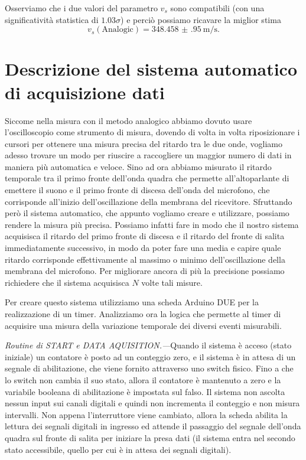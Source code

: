 \documentclass[
    prl,
    reprint, 
    superscriptaddress, 
    altaffilletter, 
    amsmath, 
    amssymb, 
    a4paper,
    varvw]{revtex4-2}
\begin{document}
Osserviamo che i due valori del parametro $v_s$ sono compatibili (con una significatività statistica di $1.03\sigma$) e perciò possiamo ricavare la miglior stima \[v_s(\text{Analogic})=\SI{348.458(950)}{\metre\per\second}.\]

\section{Descrizione del sistema automatico di acquisizione dati}
Siccome nella misura con il metodo analogico abbiamo dovuto usare l'oscilloscopio come strumento di misura, dovendo di volta in volta riposizionare i cursori per ottenere una misura precisa del ritardo tra le due onde, vogliamo adesso trovare un modo per riuscire a raccogliere un maggior numero di dati in maniera più automatica e veloce.
Sino ad ora abbiamo misurato il ritardo temporale tra il primo fronte dell'onda quadra che permette all'altoparlante di emettere il suono e il primo fronte di discesa dell'onda del microfono, che corrisponde all'inizio dell'oscillazione della membrana del ricevitore. Sfruttando però il sistema automatico, che appunto vogliamo creare e utilizzare, possiamo rendere la misura più precisa. Possiamo infatti fare in modo che il nostro sistema acquisisca il ritardo del primo fronte di discesa e il ritardo del fronte di salita immediatamente successivo, in modo da poter fare una media e capire quale ritardo corrisponde effettivamente al massimo o minimo dell'oscillazione della membrana del microfono. Per migliorare ancora di più la precisione possiamo richiedere che il sistema acquisisca $N$ volte tali misure.

Per creare questo sistema utilizziamo una scheda Arduino DUE per la realizzazione di un timer.  Analizziamo ora la logica che permette al timer di acquisire una misura della variazione temporale dei diversi eventi misurabili. 

\textit{Routine di \emph{START} e \emph{DATA AQUISITION}.---}Quando il sistema è acceso (stato iniziale) un contatore è posto ad un conteggio zero, e il sistema è in attesa di un segnale di abilitazione, che viene fornito attraverso uno switch fisico. Fino a che lo switch non cambia il suo stato, allora il contatore è mantenuto a zero e la variabile booleana di abilitazione è impostata sul falso. Il sistema non ascolta nessun input sui canali digitali e quindi non incrementa il conteggio e non misura intervalli. Non appena l'interruttore viene cambiato, allora la scheda abilita la lettura dei segnali digitali in ingresso ed attende il passaggio del segnale dell'onda quadra sul fronte di salita per iniziare la presa dati (il sistema entra nel secondo stato accessibile, quello per cui è in attesa dei segnali digitali).
\end{document}
